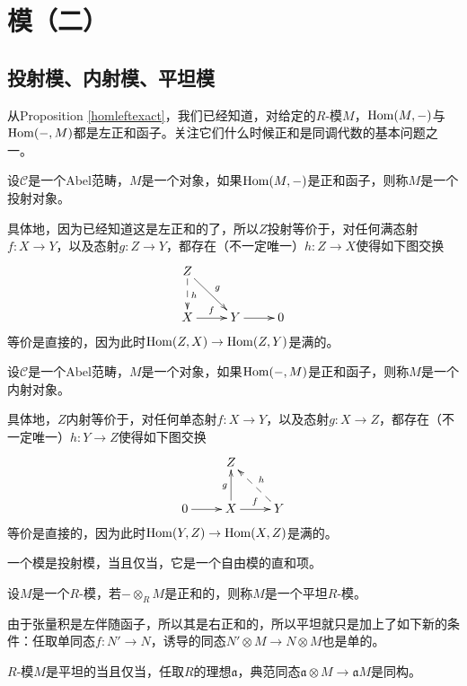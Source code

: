 \chapter{模（二）}

\section{投射模、内射模、平坦模}

从Proposition \ref{homleftexact}，我们已经知道，对给定的$R$-模$M$，$\operatorname{Hom}(M,-)$与$\operatorname{Hom}(-,M)$都是左正和函子。关注它们什么时候正和是同调代数的基本问题之一。

\begin{para}[投射对象]
	设$\mathcal C$是一个Abel范畴，$M$是一个对象，如果$\operatorname{Hom}(M,-)$是正和函子，则称$M$是一个投射对象。
\end{para}

具体地，因为已经知道这是左正和的了，所以$Z$投射等价于，对任何满态射$f:X\to Y$，以及态射$g:Z\to Y$，都存在（不一定唯一）$h:Z\to X$使得如下图交换
\[
	\xymatrix{
Z \ar@{->}[rd]^g \ar@{-->}[d]^h &  &  \\
X \ar@{->}[r]^f & Y \ar@{->}[r] & 0
}
\]
等价是直接的，因为此时$\operatorname{Hom}(Z,X)\to \operatorname{Hom}(Z,Y)$是满的。

\begin{para}[内射对象]
	设$\mathcal C$是一个Abel范畴，$M$是一个对象，如果$\operatorname{Hom}(-,M)$是正和函子，则称$M$是一个内射对象。
\end{para}

具体地，$Z$内射等价于，对任何单态射$f:X\to Y$，以及态射$g:X\to Z$，都存在（不一定唯一）$h:Y\to Z$使得如下图交换
\[
	\xymatrix{
 &  Z & \\
0 \ar@{->}[r] & X \ar@{->}[r]^f \ar[u]^g & Y \ar@{-->}[ul]_h
}
\]
等价是直接的，因为此时$\operatorname{Hom}(Y,Z)\to \operatorname{Hom}(X,Z)$是满的。

\begin{pro}
	一个模是投射模，当且仅当，它是一个自由模的直和项。
\end{pro}

\begin{para}[平坦模]
	设$M$是一个$R$-模，若$-\otimes_R M$是正和的，则称$M$是一个平坦$R$-模。
\end{para}

由于张量积是左伴随函子，所以其是右正和的，所以平坦就只是加上了如下新的条件：任取单同态$f:N'\to N$，诱导的同态$N'\otimes M \to N\otimes M$也是单的。

\begin{pro}
	$R$-模$M$是平坦的当且仅当，任取$R$的理想$\mathfrak a$，典范同态$\mathfrak a\otimes M\to \mathfrak aM$是同构。
\end{pro}

